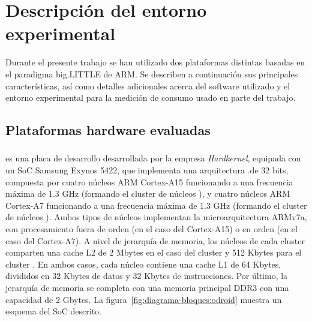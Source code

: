 \section{Descripción del entorno experimental}

Durante el presente trabajo se han utilizado dos plataformas distintas basadas en el paradigma big.LITTLE de ARM.
Se describen a continuación sus principales características, así como detalles adicionales acerca del software 
utilizado y el entorno experimental para la medición de consumo usado en parte del trabajo.

\subsection{Plataformas hardware evaluadas}

\subsubsection{\odroid}
\odroidxu es una placa de desarrollo desarrollada por la empresa {\em
  Hardkernel}, equipada con un SoC Samsung Exynos 5422, que implementa una
arquitectura \big.\LITTLE de 32 bits, compuesta por cuatro núcleos ARM
Cortex-A15 funcionando a una frecuencia máxima de 1.3 GHz (formando el
cluster de núcleos \BIG), y cuatro núcleos ARM Cortex-A7 funcionando a una
frecuencia máxima de 1.3 GHz (formando el cluster de núcleos
\LITTLE). Ambos tipos de núcleos implementan la microarquitectura ARMv7a,
con procesamiento fuera de orden (en el caso del Cortex-A15) o en orden (en
el caso del Cortex-A7). A nivel de jerarquía de memoria, los núcleos de
cada cluster comparten una cache L2 de 2 Mbytes en el caso del cluster \BIG
y 512 Kbytes para el cluster \LITTLE. En ambos casos, cada núcleo contiene
una cache L1 de 64 Kbytes, divididos en 32 Kbytes de datos y 32 Kbytes de
instrucciones. Por último, la jerarquía de memoria se completa con una
memoria principal DDR3 con una capacidad de 2 Gbytes. La
figura~\ref{fig:diagrama-bloques:odroid} muestra un esquema del SoC
descrito.

\subsubsection{\juno}

